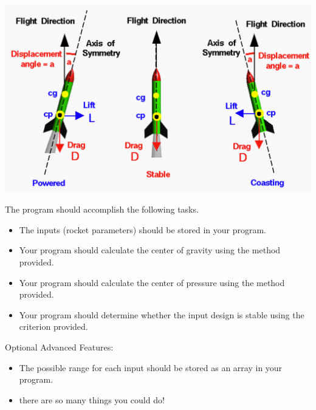 \documentclass[12pt]{article}
\begin{document}
\begin{description}[labelindent=1cm]
\includegraphics[scale=.3]{rocket_stability.png}


\newpage
\item[\textbf{\underline{Program Minimum Requirements:}}] \hfill \vspace{0mm}

The program should accomplish the following tasks. 


\begin{itemize}

	\item The inputs (rocket parameters) should be stored in your program.

	\item Your program should calculate the center of gravity using the method provided.
	
	\item Your program should calculate the center of pressure using the method provided.
	
	\item Your program should determine whether the input design is stable using the criterion provided.

\end{itemize}	 
	Optional Advanced Features:
\begin{itemize}
	\item The possible range for each input should be stored as an array in your program.
		
	\item there are so many things you could do!
    
\end{itemize}	



\end{description}
\end{document}
